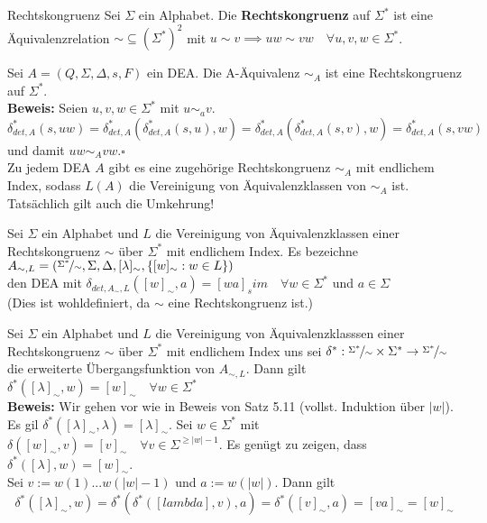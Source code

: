 \begin{defn}{Rechtskongruenz}
    Sei $\Sigma$ ein Alphabet. Die \textbf{Rechtskongruenz} auf $\Sigma^*$ ist eine Äquivalenzrelation $\sim \subseteq (\Sigma^*)^2$ mit $u \sim v \implies uw \sim vw \quad \forall u, v, w \in \Sigma^*$.
\end{defn}

\begin{prop}{}
    Sei $A = (Q, \Sigma, \Delta, s, F)$ ein DEA. Die A-Äquivalenz $\sim_A$ ist eine Rechtskongruenz auf $\Sigma^*$.\\
    
    \textbf{Beweis:} Seien $u, v, w \in \Sigma^*$ mit $u \sim_a v$.
    $$\delta^*_{det, A}(s, uw) = \delta^*_{det, A}(\delta^*_{det, A}(s, u), w) = \delta^*_{det, A}(\delta^*_{det, A}(s, v), w) = \delta^*_{det, A}(s, vw)$$
    und damit $uw \sim_A vw$.\hspace*{\fill}$\square$\\
    
    Zu jedem DEA $A$ gibt es eine zugehörige Rechtskongruenz $\sim_A$ mit endlichem Index, sodass $L(A)$ die Vereinigung von Äquivalenzklassen von $\sim_A$ ist. Tatsächlich gilt auch die Umkehrung!
\end{prop}

\begin{defn}{}
    Sei $\Sigma$ ein Alphabet und $L$ die Vereinigung von Äquivalenzklassen einer Rechtskongruenz $\sim$ über $\Sigma^*$ mit endlichem Index. Es bezeichne $A_{\sim, L} = (\nicefrac{\Sigma^*}{\sim}, \Sigma, \Delta, [\lambda]_\sim, \{[w]_\sim :  w \in L\})$\\ den DEA mit $\delta_{det, A_\sim, L}([w]_\sim, a) = [wa]_sim \quad \forall w \in \Sigma^*$ und $a \in \Sigma$\\
    (Dies ist wohldefiniert, da $\sim$ eine Rechtskongruenz ist.)
\end{defn}

\begin{lemma}{}
    Sei $\Sigma$ ein Alphabet und $L$ die Vereinigung von Äquivalenzklasssen einer Rechtskongruenz $\sim$ über $\Sigma^*$ mit endlichem Index uns sei $\delta^* : \nicefrac{\Sigma^*}{\sim} \times \Sigma^* \to \nicefrac{\Sigma^*}{\sim}$ die erweiterte Übergangsfunktion von $A_{\sim, L}$. Dann gilt $\delta^*([\lambda]_\sim, w) = [w]_\sim \quad \forall w \in \Sigma^*$\\
    
    \textbf{Beweis:} Wir gehen vor wie in Beweis von Satz 5.11 (vollst. Induktion über $|w|$).\\
    Es gil $\delta^*([\lambda]_\sim, \lambda) = [\lambda]_\sim$. Sei $w \in \Sigma^*$ mit $\delta([w]_\sim, v) = [v]_\sim \quad \forall v \in \Sigma^{\geq |w|-1}$. Es genügt zu zeigen, dass $\delta^*([\lambda], w) = [w]_\sim$.\\
    Sei $v := w(1) ... w(|w|-1)$ und $a := w(|w|)$.
    Dann gilt
    $$\delta^*([\lambda]_\sim, w) = \delta^*(\delta^*([lambda], v), a) = \delta^*([v]_\sim, a) = [va]_\sim = [w]_\sim$$
    \rightline{$\square$}
\end{lemma}

